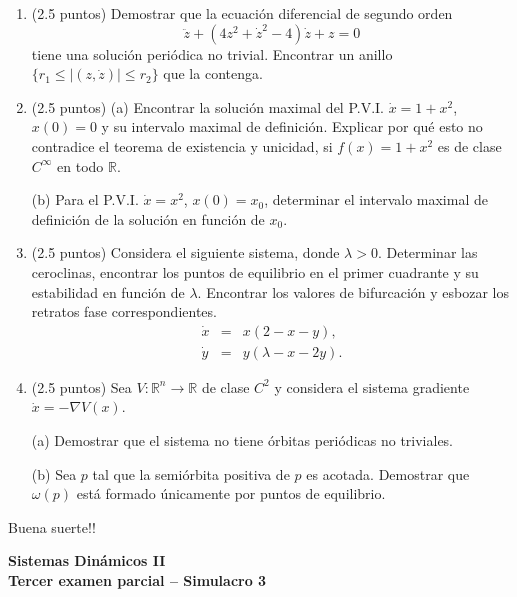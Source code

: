 \documentclass[11pt]{article}
\begin{document}
\begin{enumerate}
\item (2.5 puntos) Demostrar que la ecuación diferencial de segundo orden
$$\ddot z+(4z^2+\dot z^2-4)\dot z+z=0$$
tiene una solución periódica no trivial. Encontrar un anillo $\{r_1\le |(z,\dot z)|\le r_2\}$ que la contenga.
\vspace{0.15cm}

\item (2.5 puntos) (a) Encontrar la solución maximal del P.V.I. $\dot x=1+x^2$, $x(0)=0$ y su intervalo maximal de definición. Explicar por qué esto no contradice el teorema de existencia y unicidad, si $f(x)=1+x^2$ es de clase $C^\infty$ en todo $\mathbb{R}$.

(b) Para el P.V.I. $\dot x=x^2$, $x(0)=x_0$, determinar el intervalo maximal de definición de la solución en función de $x_0$.
\vspace{0.15cm}

\item (2.5 puntos) Considera el siguiente sistema, donde $\lambda>0$. Determinar las ceroclinas, encontrar los puntos de equilibrio en el primer cuadrante y su estabilidad en función de $\lambda$. Encontrar los valores de bifurcación y esbozar los retratos fase correspondientes.
\begin{eqnarray*}
\dot x &=& x(2-x-y), \\
\dot y &=& y(\lambda-x-2y).
\end{eqnarray*}
\vspace{0.15cm}

\item (2.5 puntos) Sea $V:\mathbb{R}^n\to\mathbb{R}$ de clase $C^2$ y considera el sistema gradiente $\dot x=-\nabla V(x)$.

(a) Demostrar que el sistema no tiene órbitas periódicas no triviales.

(b) Sea $p$ tal que la semiórbita positiva de $p$ es acotada. Demostrar que $\omega(p)$ está formado únicamente por puntos de equilibrio.
\vspace{0.15cm}

\end{enumerate}

\vspace{0.5cm}
\begin{center}
\Large Buena suerte!!
\end{center}

\newpage
\textbf{Sistemas Dinámicos II}\\
\textbf{Tercer examen parcial -- Simulacro 3}
\end{document}
